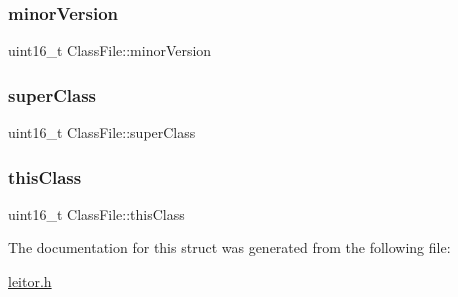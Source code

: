 \mbox{\label{structClassFile_afb41e706bd0e19ed5a24cd0e99ecc4c1}} 
\subsubsection{\texorpdfstring{minor\+Version}{minorVersion}}
{\footnotesize\ttfamily uint16\+\_\+t Class\+File\+::minor\+Version}

\mbox{\label{structClassFile_a306c9da73620fa5ad94bbaa64a19afdd}} 
\subsubsection{\texorpdfstring{super\+Class}{superClass}}
{\footnotesize\ttfamily uint16\+\_\+t Class\+File\+::super\+Class}

\mbox{\label{structClassFile_abc02e661935c638b2f231cef576859f1}} 
\subsubsection{\texorpdfstring{this\+Class}{thisClass}}
{\footnotesize\ttfamily uint16\+\_\+t Class\+File\+::this\+Class}



The documentation for this struct was generated from the following file\+:\begin{DoxyCompactItemize}
\item 
\hyperlink{leitor_8h}{leitor.\+h}\end{DoxyCompactItemize}
